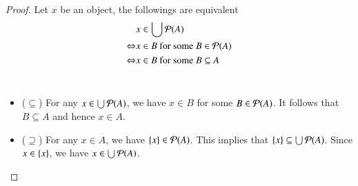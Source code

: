 \begin{proof}
    Let $x$ be an object, the followings are equivalent 
    \begin{align*}
        & x\in \bigcup \mathcal{P}(A)\\
        \Leftrightarrow & x\in B\text{ for some }B\in\mathcal{P}(A)\\
        \Leftrightarrow & x\in B \text{ for some }B\subseteq A
    \end{align*}
    ~
    \begin{itemize}
        \item ($\subseteq$) For any $x\in\bigcup \mathcal{P}(A)$, we have $x\in B$ for some $B\in \mathcal{P}(A)$. It follows that $B\subseteq A$ and hence $x\in A$.
        \item ($\supseteq$) For any $x\in A$, we have $\{x\}\in\mathcal{P}(A)$. This implies that $\{x\}\subseteq \bigcup\mathcal{P}(A)$. Since $x\in\{x\}$, we have $x\in\bigcup \mathcal{P}(A)$.
    \end{itemize}
\end{proof}
